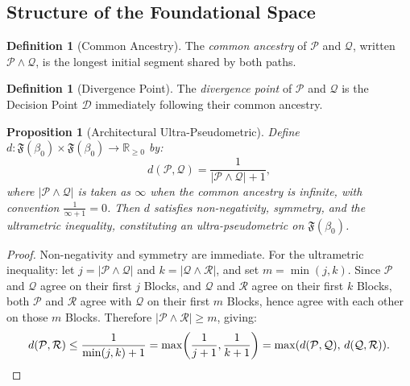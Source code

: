 \documentclass[12pt, a4paper]{article}
\theoremstyle{plain}
\newtheorem{proposition}[theorem]{Proposition}
\theoremstyle{definition}
\newtheorem{definition}[theorem]{Definition}
\theoremstyle{remark}
\newcommand{\FS}[1]{\mathfrak{F}(#1)}
\newcommand{\CA}[2]{#1 \wedge #2}
\begin{document}
\subsection{Structure of the Foundational Space}
\label{subsec:fs-structure}

\begin{definition}[Common Ancestry]
\label{def:common-ancestry}
The \emph{common ancestry} of $\mathcal{P}$ and $\mathcal{Q}$,
written $\CA{\mathcal{P}}{\mathcal{Q}}$, is the longest initial
segment shared by both paths.
\end{definition}

\begin{definition}[Divergence Point]
\label{def:divergence}
The \emph{divergence point} of $\mathcal{P}$ and $\mathcal{Q}$ is the
Decision Point $\mathcal{D}$ immediately following their common
ancestry.
\end{definition}

\begin{proposition}[Architectural Ultra-Pseudometric]
\label{prop:metric}
Define $d : \FS{\beta_0} \times \FS{\beta_0} \to \mathbb{R}_{\geq 0}$ by:
\[
  d(\mathcal{P}, \mathcal{Q})
  = \frac{1}{|\CA{\mathcal{P}}{\mathcal{Q}}| + 1},
\]
where $|\CA{\mathcal{P}}{\mathcal{Q}}|$ is taken as $\infty$ when
the common ancestry is infinite, with convention
$\frac{1}{\infty+1}=0$. Then $d$ satisfies non-negativity,
symmetry, and the ultrametric inequality, constituting an
\emph{ultra-pseudometric} on $\FS{\beta_0}$.
\end{proposition}

\begin{proof}
Non-negativity and symmetry are immediate. For the ultrametric
inequality: let $j = |\CA{\mathcal{P}}{\mathcal{Q}}|$ and
$k = |\CA{\mathcal{Q}}{\mathcal{R}}|$, and set $m = \min(j,k)$.
Since $\mathcal{P}$ and $\mathcal{Q}$ agree on their first $j$ Blocks,
and $\mathcal{Q}$ and $\mathcal{R}$ agree on their first $k$ Blocks,
both $\mathcal{P}$ and $\mathcal{R}$ agree with $\mathcal{Q}$ on their
first $m$ Blocks, hence agree with each other on those $m$ Blocks.
Therefore $|\CA{\mathcal{P}}{\mathcal{R}}| \geq m$, giving:
\[
  d(\mathcal{P},\mathcal{R})
  \leq \frac{1}{\min(j,k)+1}
  = \max\!\left(\frac{1}{j+1},\frac{1}{k+1}\right)
  = \max(d(\mathcal{P},\mathcal{Q}),\,d(\mathcal{Q},\mathcal{R})).
\qedhere
\]
\end{proof}
\end{document}
